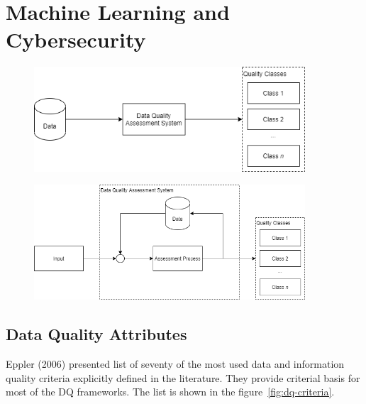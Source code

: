 \chapter{Machine Learning and Cybersecurity}\label{ch:machine-learning-and-cybersecurity}

\begin{figure}[htb]
    \centering
    \includegraphics[width=0.9\textwidth]{figures/dq-simple.png}
    \caption{}
    \label{fig:dq-simple}
\end{figure}
\FloatBarrier

\begin{figure}[htb]
    \centering
    \includegraphics[width=0.9\textwidth]{figures/dq-system.png}
    \caption{}
    \label{fig:dq-system}
\end{figure}
\FloatBarrier

\section{Data Quality Attributes}

Eppler (2006) presented list of seventy of the most used data and information quality criteria explicitly defined in the literature.
They provide criterial basis for most of the DQ frameworks.
The list is shown in the figure~\ref{fig:dq-criteria}.

